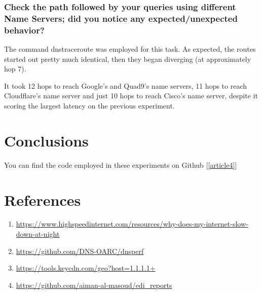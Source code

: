 \documentclass[a4paper,10pt]{article}
\begin{document}
\subsubsection{Check the path followed by your queries using different Name Servers; did you
notice any expected/unexpected behavior?}

The command dnstraceroute was employed for this task. As expected, the routes started out pretty much identical, then they began diverging (at approximately hop 7). 

It took 12 hops to reach Google's and Quad9's name servers, 11 hops to reach Cloudflare's name server and just 10 hops to reach Cisco's name server, despite it scoring the largest latency on the previous experiment.


\clearpage

\section{Conclusions}

You can find the code employed in these experiments on Github [\ref{article4}] 

\section{References}

\begin{enumerate}

\item \label{article1}  \url{https://www.highspeedinternet.com/resources/why-does-my-internet-slow-down-at-night} 
\item \label{article2}  \url{https://github.com/DNS-OARC/dnsperf} 
\item \label{article3}  \url{https://tools.keycdn.com/geo?host=1.1.1.1+} 
\item \label{article4}  \url{https://github.com/aiman-al-masoud/edi_reports} 

\end{enumerate}
\end{document}
